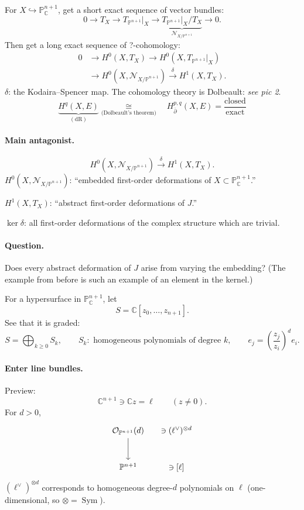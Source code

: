 \documentclass[11pt]{article}
\newcommand{\C}{\mathbb C}
\newcommand{\PP}{\mathbb P}
\newcommand{\OO}{\mathcal O}
\newcommand{\NN}{\mathcal N}
\begin{document}
For $X\hookrightarrow\PP^{n+1}_{\C}$, get a short exact sequence of
vector bundles:
\[
 0\longrightarrow T_X\longrightarrow T_{\PP^{n+1}}|_X
 \longrightarrow
 \underbrace{T_{\PP^{n+1}}|_X/T_X}_{\NN_{X/\PP^{n+1}}}
 \longrightarrow0.
\]
Then get a long exact sequence of ?-cohomology:
\[
\begin{aligned}
 0&\longrightarrow H^0(X,T_X)
 \longrightarrow H^0(X,T_{\PP^{n+1}}|_X)\\
 &\longrightarrow H^0(X,\NN_{X/\PP^{n+1}})
 \xrightarrow{\delta}H^1(X,T_X).
\end{aligned}
\]
$\delta$: the Kodaira--Spencer map.
The cohomology theory is Dolbeault: \textit{see pic 2}.
\[
 \underbrace{H^q(X,E)}_{(\mathrm{dR})}
 \underset{\text{(Dolbeault's theorem)}}{\cong}\quad
H^{p,q}_{\overline{\partial}}(X,E) = \frac{\text{closed}}{\text{exact}}\]

\paragraph{Main antagonist.}
\[
 H^0(X,\NN_{X/\PP^{n+1}})\xrightarrow{\delta}H^1(X,T_X).
\]
$H^0(X,\NN_{X/\PP^{n+1}})$: ``embedded first-order deformations of
$X\subset\PP^{n+1}_{\C}$.''

$H^1(X,T_X)$: ``abstract first-order deformations of $J$.''

$\ker\delta$: all first-order deformations of the complex structure
which are trivial.

\paragraph{Question.}
Does every abstract deformation of $J$ arise from varying the embedding?
(The example from before is such an example of an element in the kernel.)

For a hypersurface in $\PP^{n+1}_{\C}$, let
\[
 S=\C[z_0,\ldots,z_{n+1}].
\]
See that it is graded:
\[
 S=\bigoplus_{k\geq0}S_k,
 \qquad S_k:\text{ homogeneous polynomials of degree }k,
 \qquad e_j=\left(\frac{z_j}{z_i}\right)^d e_i.
\]

\paragraph{Enter line bundles.}
Preview:
\[
 \C^{n+1}\ni\C z=\ell\qquad(z\neq0).
\]
For $d>0$,
\[
\begin{tikzcd}[row sep=large,column sep=small]
 \OO_{\PP^{n+1}}(d) \arrow[d]
 & \ni (\ell^{\vee})^{\otimes d}\\
 \PP^{n+1} & \ni[\ell]
\end{tikzcd}
\]
$(\ell^{\vee})^{\otimes d}$ corresponds to homogeneous degree-$d$
polynomials on $\ell$ (one-dimensional, so $\otimes=\operatorname{Sym}$).
\end{document}
